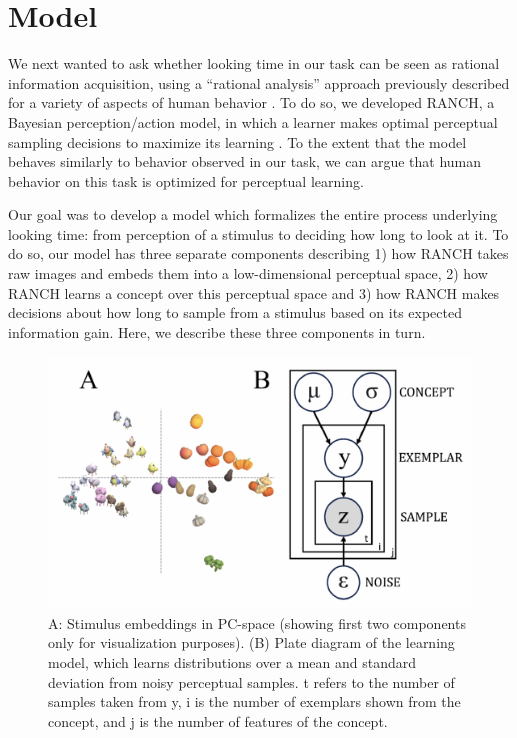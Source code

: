 \documentclass[10pt, letterpaper]{article}
\newenvironment{CodeChunk}{}{}
\begin{document}
\hypertarget{model}{%
\section{Model}\label{model}}

We next wanted to ask whether looking time in our task can be seen as
rational information acquisition, using a ``rational analysis'' approach
previously described for a variety of aspects of human behavior
\cite{chater, dubey}. To do so, we developed RANCH, a Bayesian
perception/action model, in which a learner makes optimal perceptual
sampling decisions to maximize its learning
\cite{cao2023habituation, raz2023modeling}. To the extent that the model
behaves similarly to behavior observed in our task, we can argue that
human behavior on this task is optimized for perceptual learning.

Our goal was to develop a model which formalizes the entire process
underlying looking time: from perception of a stimulus to deciding how
long to look at it. To do so, our model has three separate components
describing 1) how RANCH takes raw images and embeds them into a
low-dimensional perceptual space, 2) how RANCH learns a concept over
this perceptual space and 3) how RANCH makes decisions about how long to
sample from a stimulus based on its expected information gain. Here, we
describe these three components in turn.

\begin{CodeChunk}
\begin{figure}[H]

{\centering \includegraphics{figs/model_fig-1} 

}

\caption[A]{A: Stimulus embeddings in PC-space (showing first two components only for visualization purposes). (B) Plate diagram of the learning model, which learns distributions over a mean and standard deviation from noisy perceptual samples. t refers to the number of samples taken from y, i is the number of exemplars shown from the concept, and j is the number of features of the concept.}\label{fig:model_fig}
\end{figure}
\end{CodeChunk}
\end{document}
